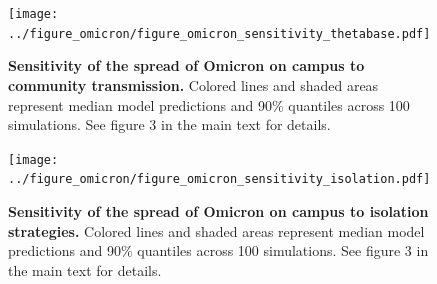\documentclass[12pt]{article}
\begin{document}
\pagebreak

\begin{figure}[!htp]
\texttt{[image: ../figure\_omicron/figure\_omicron\_sensitivity\_thetabase.pdf]}
\caption{
\textbf{Sensitivity of the spread of Omicron on campus to community transmission.}
Colored lines and shaded areas represent median model predictions and 90\% quantiles across 100 simulations.
See figure 3 in the main text for details.
}
\end{figure}

\pagebreak

\begin{figure}[!htp]
\texttt{[image: ../figure\_omicron/figure\_omicron\_sensitivity\_isolation.pdf]}
\caption{
\textbf{Sensitivity of the spread of Omicron on campus to isolation strategies.}
Colored lines and shaded areas represent median model predictions and 90\% quantiles across 100 simulations.
See figure 3 in the main text for details.
}
\end{figure}
\end{document}
